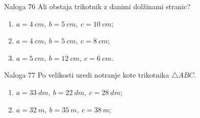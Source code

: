         \begin{frame}
            \begin{exampleblock}{Naloga 76}
                Ali obstaja trikotnik z danimi dolžinami stranic?
                \begin{enumerate}
                    \item $a=4~cm,\ b=5~cm,\ c=10~cm$;
                    \item $a=4~cm,\ b=5~cm,\ c=8~cm$;
                    \item $a=5~cm,\ b=12~cm,\ c=6~cm$.
                \end{enumerate}
            \end{exampleblock}

            \pause
            \begin{exampleblock}{Naloga 77}
                Po velikosti uredi notranje kote trikotnika $\triangle ABC$.
                \begin{enumerate}
                    \item $a=33~dm,\ b=22~dm,\ c=28~dm$;
                    \item $a=32~m,\ b=35~m,\ c=38~m$;
                \end{enumerate}
            \end{exampleblock}

        \end{frame}


